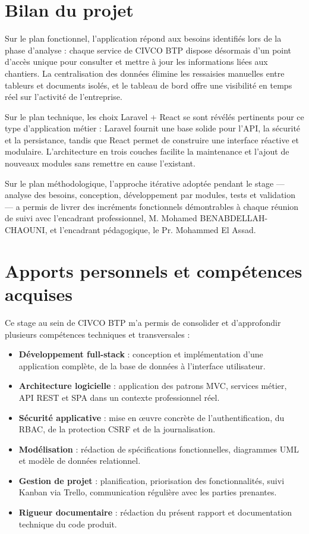 \section*{Bilan du projet}

Sur le plan fonctionnel, l'application répond aux besoins identifiés lors de la
phase d'analyse : chaque service de CIVCO BTP dispose désormais d'un point d'accès
unique pour consulter et mettre à jour les informations liées aux chantiers. La
centralisation des données élimine les ressaisies manuelles entre tableurs et
documents isolés, et le tableau de bord offre une visibilité en temps réel sur
l'activité de l'entreprise.

\medskip

Sur le plan technique, les choix Laravel + React se sont révélés pertinents pour
ce type d'application métier : Laravel fournit une base solide pour l'API, la
sécurité et la persistance, tandis que React permet de construire une interface
réactive et modulaire. L'architecture en trois couches facilite la maintenance
et l'ajout de nouveaux modules sans remettre en cause l'existant.

\medskip

Sur le plan méthodologique, l'approche itérative adoptée pendant le stage ---
analyse des besoins, conception, développement par modules, tests et validation
--- a permis de livrer des incréments fonctionnels démontrables à chaque réunion
de suivi avec l'encadrant professionnel, M. Mohamed BENABDELLAH-CHAOUNI, et
l'encadrant pédagogique, le Pr. Mohammed El Assad.

\section*{Apports personnels et compétences acquises}

Ce stage au sein de CIVCO BTP m'a permis de consolider et d'approfondir
plusieurs compétences techniques et transversales :

\begin{itemize}
  \item \textbf{Développement full-stack} : conception et implémentation d'une
  application complète, de la base de données à l'interface utilisateur.
  \item \textbf{Architecture logicielle} : application des patrons MVC, services
  métier, API REST et SPA dans un contexte professionnel réel.
  \item \textbf{Sécurité applicative} : mise en œuvre concrète de l'authentification,
  du RBAC, de la protection CSRF et de la journalisation.
  \item \textbf{Modélisation} : rédaction de spécifications fonctionnelles,
  diagrammes UML et modèle de données relationnel.
  \item \textbf{Gestion de projet} : planification, priorisation des fonctionnalités,
  suivi Kanban via Trello, communication régulière avec les parties prenantes.
  \item \textbf{Rigueur documentaire} : rédaction du présent rapport et documentation
  technique du code produit.
\end{itemize}

